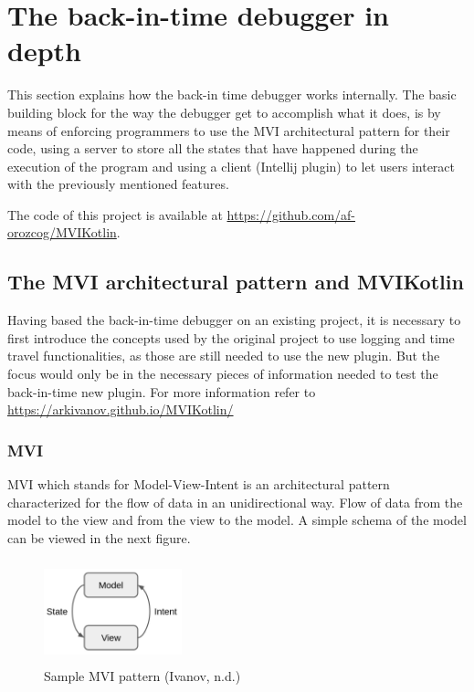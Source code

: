 
\chapter{The back-in-time debugger in depth}
\label{cha:indepth}

This section explains how the back-in time debugger works internally. The basic building block for the way the debugger get to accomplish what it does, is by means of enforcing programmers to use the MVI architectural pattern for their code, using a server to store all the states that have happened during the execution of the program and using a client (Intellij plugin) to let users interact with the previously mentioned features.

The code of this project is available at \url{https://github.com/af-orozcog/MVIKotlin}.

\section{The MVI architectural pattern and MVIKotlin}

Having based the back-in-time debugger on an existing project, it is necessary to first introduce the concepts used by the original project to use logging and time travel functionalities, as those are still needed to use the new plugin. But the focus would only be in the necessary pieces of information needed to test the back-in-time new plugin. For more information refer to \url{https://arkivanov.github.io/MVIKotlin/}

\subsection{MVI}

MVI which stands for Model-View-Intent is an architectural pattern characterized for the flow of data in an unidirectional way. Flow of data from the model to the view and from the view to the model. A simple schema of the model can be viewed in the next figure.

\begin{figure}[h]
\centering
\includegraphics[height=3cm,width=4cm]{figures/mvi}
\caption{Sample MVI pattern (Ivanov, n.d.)}
\label{fig: Sample MVI pattern}
\end{figure}

